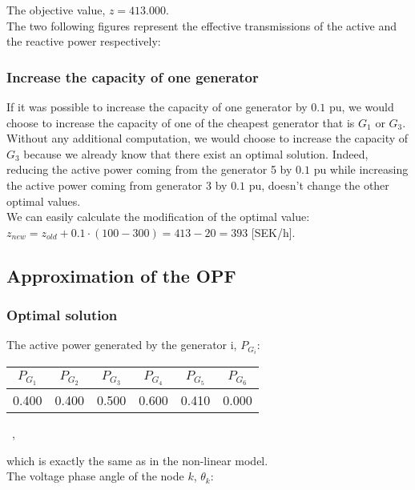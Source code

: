 \noindent
The objective value, $z = 413.000$.\\

The two following figures represent the effective transmissions of the active and the reactive power respectively:




\newpage

\subsubsection*{Increase the capacity of one generator}

If it was possible to increase the capacity of one generator by $0.1$ pu, we would choose to increase the capacity of one of the cheapest generator that is $G_1$ or $G_3$. Without any additional computation, we would choose to increase the capacity of $G_3$ because we already know that there exist an optimal solution. Indeed, reducing the active power coming from the generator 5 by $0.1$ pu while increasing the active power coming from generator 3 by $0.1$ pu, doesn't change the other optimal values.\\
We can easily calculate the modification of the optimal value: \\
$z_{new} = z_{old} + 0.1 \cdot (100 - 300) = 413 - 20 = 393$ [SEK/h].

\subsection{Approximation of the OPF}
\subsubsection*{Optimal solution}
The active power generated by the generator i, $P_{G_i}$:

\begin{table}[!h]
    \centering
\begin{tabular}{|c|c|c|c|c|c|}
  \hline
  $P_{G_1}$ & $P_{G_2}$ & $P_{G_3}$ & $P_{G_4}$ & $P_{G_5}$ & $P_{G_6}$ \\
  \hline
  0.400 & 0.400 & 0.500 & 0.600 & 0.410 & 0.000 \\
  \hline
\end{tabular} \ ,
\end{table}
\noindent
which is exactly the same as in the non-linear model.\\

The voltage phase angle of the node $k$, $\theta_k$:

